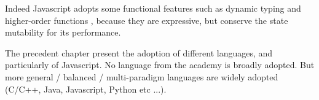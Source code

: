 Indeed Javascript adopts some functional features such as dynamic typing and higher-order functions \cite{Ecma1999}, because they are expressive, but conserve the state mutability for its performance.

The precedent chapter present the adoption of different languages, and particularly of Javascript.
No language from the academy is broadly adopted.
But more general / balanced / multi-paradigm languages are widely adopted (C/C++, Java, Javascript, Python etc ...).








